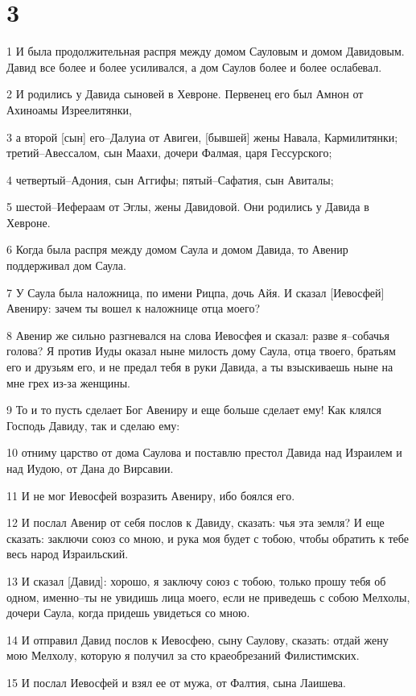 \chapter{3}

\par 1 И была продолжительная распря между домом Сауловым и домом Давидовым. Давид все более и более усиливался, а дом Саулов более и более ослабевал.
\par 2 И родились у Давида сыновей в Хевроне. Первенец его был Амнон от Ахиноамы Изреелитянки,
\par 3 а второй [сын] его--Далуиа от Авигеи, [бывшей] жены Навала, Кармилитянки; третий--Авессалом, сын Маахи, дочери Фалмая, царя Гессурского;
\par 4 четвертый--Адония, сын Аггифы; пятый--Сафатия, сын Авиталы;
\par 5 шестой--Иефераам от Эглы, жены Давидовой. Они родились у Давида в Хевроне.
\par 6 Когда была распря между домом Саула и домом Давида, то Авенир поддерживал дом Саула.
\par 7 У Саула была наложница, по имени Рицпа, дочь Айя. И сказал [Иевосфей] Авениру: зачем ты вошел к наложнице отца моего?
\par 8 Авенир же сильно разгневался на слова Иевосфея и сказал: разве я--собачья голова? Я против Иуды оказал ныне милость дому Саула, отца твоего, братьям его и друзьям его, и не предал тебя в руки Давида, а ты взыскиваешь ныне на мне грех из-за женщины.
\par 9 То и то пусть сделает Бог Авениру и еще больше сделает ему! Как клялся Господь Давиду, так и сделаю ему:
\par 10 отниму царство от дома Саулова и поставлю престол Давида над Израилем и над Иудою, от Дана до Вирсавии.
\par 11 И не мог Иевосфей возразить Авениру, ибо боялся его.
\par 12 И послал Авенир от себя послов к Давиду, сказать: чья эта земля? И еще сказать: заключи союз со мною, и рука моя будет с тобою, чтобы обратить к тебе весь народ Израильский.
\par 13 И сказал [Давид]: хорошо, я заключу союз с тобою, только прошу тебя об одном, именно--ты не увидишь лица моего, если не приведешь с собою Мелхолы, дочери Саула, когда придешь увидеться со мною.
\par 14 И отправил Давид послов к Иевосфею, сыну Саулову, сказать: отдай жену мою Мелхолу, которую я получил за сто краеобрезаний Филистимских.
\par 15 И послал Иевосфей и взял ее от мужа, от Фалтия, сына Лаишева.
